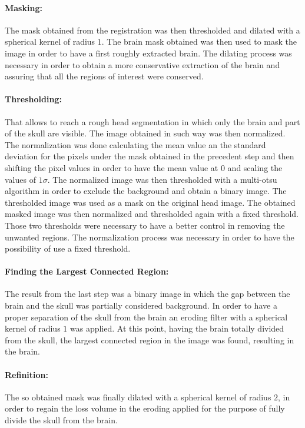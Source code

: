 \documentclass{standalone}
\begin{document}
\paragraph{Masking:} The mask obtained from the registration was then thresholded and dilated with a spherical kernel of radius $1$. The brain mask obtained was then used to mask the image in order to have a first roughly extracted brain.
The dilating process was necessary in order to obtain a more conservative extraction of the brain and assuring that all the regions of interest were conserved.

\paragraph{Thresholding:}
That allows to reach a rough head segmentation in which only the brain and part of the skull are visible. 
The image obtained in such way was then normalized. The normalization was done calculating the mean value an the standard deviation for the pixels under the mask obtained in the precedent step and then shifting the pixel values in order to have the mean value at 0 and scaling the values of $1 \sigma$.
The normalized image was then thresholded with a multi-otsu algorithm in order to exclude the background and obtain a binary image.
The thresholded image was used as a mask on the original head image.
The obtained masked image was then normalized and thresholded again with a fixed threshold.
Those two thresholds were necessary to have a better control in removing the unwanted regions.
The normalization process was necessary in order to have the possibility of use a fixed threshold.
 
\paragraph{Finding the Largest Connected Region:}
The result from the last step was a binary image in which the gap between the brain and the skull was partially considered background. In order to have a proper separation of the skull from the brain an eroding filter with a spherical kernel of radius $1$ was applied.
At this point, having the brain totally divided from the skull, the largest connected region in the image was found, resulting in the brain.

\paragraph{Refinition:}
The so obtained mask was finally dilated with a spherical kernel of radius $2$, in order to regain the loss volume in the eroding applied for the purpose of fully divide the skull from the brain.
\end{document}
